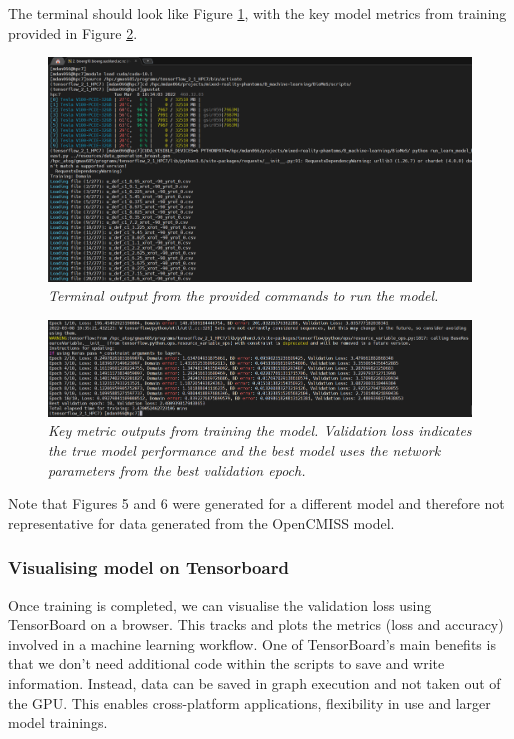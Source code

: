 \documentclass[11pt]{article}
\begin{document}
The terminal should look like Figure \ref{fig5}, with the key model metrics from training provided in Figure \ref{fig6}.
 
\begin{figure}
\centering
\includegraphics[scale=1.1]{Images/breast/commands/terminal_commands.png}
\caption{\textit{\label{fig5}Terminal output from the provided commands to run the model.}}
\end{figure}

\begin{figure}
\centering
\includegraphics[scale=1.1]{Images/breast/commands/epochs.PNG}
\caption{\textit{\label{fig6}Key metric outputs from training the model. Validation loss indicates the true model performance and the best model uses the network parameters from the best validation epoch.}}
\end{figure}

Note that Figures 5 and 6 were generated for a different model and therefore not representative for data generated from the OpenCMISS model.

\subsubsection{Visualising model on Tensorboard}
Once training is completed, we can visualise the validation loss using TensorBoard on a browser. This tracks and plots the metrics (loss and accuracy) involved in a machine learning workflow. One of TensorBoard's main benefits is that we don't need additional code within the scripts to save and write information. Instead, data can be saved in graph execution and not taken out of the GPU. This enables cross-platform applications, flexibility in use and larger model trainings. 
\end{document}
